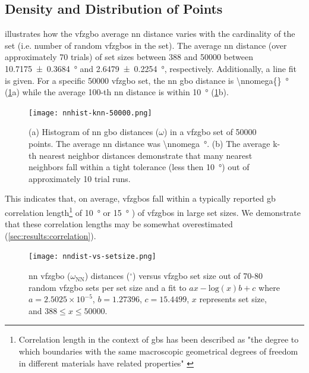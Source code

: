 \documentclass[final,twocolumn,12pt]{elsarticle}
\begin{document}
	\subsection{Density and Distribution of Points} \label{sec:results:density}
	
	 illustrates how the \gls{vfzgbo} average \gls{nn} distance varies with the cardinality of the set (i.e. number of random \glspl{vfzgbo} in the set). The average \gls{nn} distance (over approximately 70 trials) of set sizes between \num{388} and \num{50000} between \SI{10.7175 \pm 0.3684}{\degree} and \SI{2.6479 \pm 0.2254}{\degree}, respectively. Additionally, a line fit is given. For a specific \num{50000} \gls{vfzgbo} set, the \gls{nn} \gls{gbo} distance is \SI{\nnomega{}}{\degree} (\cref{fig:nnhist-knn-50000}a) while the average 100-th \gls{nn} distance is within \SI{10}{\degree} (\cref{fig:nnhist-knn-50000}b).
	
	\begin{figure}
		\centering
		\texttt{[image: nnhist-knn-50000.png]}
		\caption{(a) Histogram of \gls{nn} \gls{gbo} distances ($\omega$) in a \gls{vfzgbo} set of \num{50000} points. The average \gls{nn} distance was \SI{\nnomega}{\degree}. (b) The average k-th nearest neighbor distances demonstrate that many nearest neighbors fall within a tight tolerance (less then \SI{10}{\degree}) out of approximately 10 trial runs.}
		\label{fig:nnhist-knn-50000}
	\end{figure}
	
	This indicates that, on average, \outpt{} \glspl{vfzgbo} fall within a typically reported \gls{gb} correlation length\footnote{Correlation length in the context of \glspl{gb} has been described as "the degree to which boundaries with the same macroscopic geometrical degrees of freedom in different materials have related properties" \cite{olmstedSurveyComputedGrain2009}} of \SI{10}{\degree} \cite{rohrerComparingCalculatedMeasured2010} or \SI{15}{\degree} \cite{olmstedSurveyComputedGrain2009}) of \inpt{} \glspl{vfzgbo} in large set sizes. We demonstrate that these correlation lengths may be somewhat overestimated (\cref{sec:results:correlation}).
	
	\begin{figure}
		\centering
		\texttt{[image: nndist-vs-setsize.png]}
		\caption{\Gls{nn} \gls{vfzgbo} ($\omega_{\text{NN}}$) distances ($^{\circ}$) versus \gls{vfzgbo} set size out of 70-80 random \gls{vfzgbo} sets per set size and a fit to $ax-\mathrm{log}(x)b+c$ where $a=2.5025\times10^{-5}$, $b=1.27396$, $c=15.4499$, $x$ represents set size, and $388 \leq x \leq 50000$.}
		\label{fig:nndist-vs-setsize}
	\end{figure}
	
\end{document}
